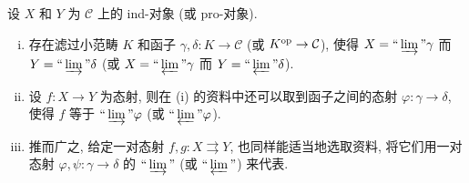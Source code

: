 \begin{lemma}\label{prop:ind-object-morphism}
	设 $X$ 和 $Y$ 为 $\mathcal{C}$ 上的 ind-对象 (或 pro-对象).
	\begin{enumerate}[(i)]
		\item 存在滤过小范畴 $K$ 和函子 $\gamma, \delta: K \to \mathcal{C}$ (或 $K^{\operatorname{op}} \to \mathcal{C}$), 使得 $X = \Yinjlim \gamma$ 而 $Y = \Yinjlim \delta$ (或 $X = \Yprojlim \gamma$ 而 $Y = \Yprojlim \delta$).
		\item 设 $f: X \to Y$ 为态射, 则在 (i) 的资料中还可以取到函子之间的态射 $\varphi: \gamma \to \delta$, 使得 $f$ 等于 $\Yinjlim \varphi$ (或 $\Yprojlim \varphi$).
		
		\item 推而广之, 给定一对态射 $f, g: X \rightrightarrows Y$, 也同样能适当地选取资料, 将它们用一对态射 $\varphi, \psi: \gamma \to \delta$ 的 $\Yinjlim$ (或 $\Yprojlim$) 来代表.
	\end{enumerate}
\end{lemma}
